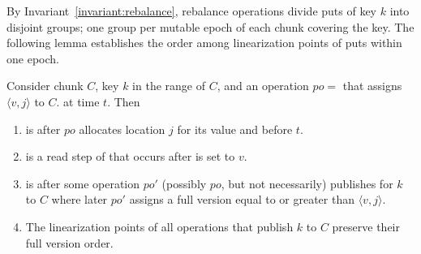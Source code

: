 By Invariant~\ref{invariant:rebalance},
rebalance operations divide puts of key $k$ into disjoint groups; one group per mutable epoch of each chunk covering the key.
The following lemma 
establishes the order among linearization points of puts within one epoch.
\begin{lemma}
\label{proof:put}
Consider chunk $C$, key $k$ in the range of $C$, and an
operation $po=$ that assigns $\langle v, j\rangle$ to $C$. at time $t$. Then  
\begin{enumerate}
\setlength{\itemsep}{0pt}
\setlength{\parskip}{0pt}
\item \label{proof:put:lp1}  is after $po$ allocates location $j$ for its value and before $t$.
\item \label{proof:put:lp2}  is a read step of  that occurs after  is set to $v$.
\item \label{proof:put:lp3}  is after some operation $po'$ (possibly $po$, but not necessarily) publishes for $k$ to $C$ where later $po'$ assigns a full version equal to or greater than $\langle v, j\rangle$.
\item \label{proof:put:lp4} The linearization points of all operations that publish $k$ to $C$ preserve their full version order.
\end{enumerate}
\end{lemma}
